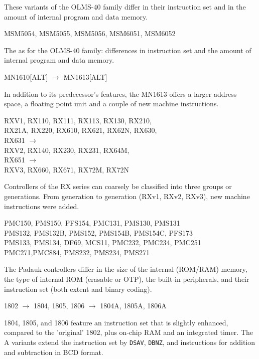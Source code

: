 \documentclass[12pt,twoside]{report}
\newcommand{\tty}[1]{{\tt #1}}
\begin{document}
These variants of the OLMS-40 family differ in their instruction
set and in the amount of internal program and data memory.
\begin{cpulist}
   MSM5054, MSM5055, MSM5056, MSM6051, MSM6052
\end{cpulist}
The as for the OLMS-40 family: differences in instruction
set and the amount of internal program and data memory.
\begin{cpulist}
   MN1610[ALT] $\rightarrow$ MN1613[ALT]
\end{cpulist}
In addition to its predecessor's features, the MN1613 offers a larger
address space, a floating point unit and a couple of new machine
instructions.
\begin{cpulist}
   RXV1, RX110, RX111, RX113, RX130, RX210,\\
\> RX21A, RX220, RX610, RX621, RX62N, RX630,\\
\> RX631 $\longrightarrow$ \\
\> RXV2, RX140, RX230, RX231, RX64M,\\
\> RX651 $\longrightarrow$ \\
\> RXV3, RX660, RX671, RX72M, RX72N
\end{cpulist}
Controllers of the RX series can coarsely be classified
into three groups or generations.  From generation to 
generation (RXv1, RXv2, RXv3), new machine instructions
were added.
\begin{cpulist}
   PMC150, PMS150, PFS154, PMC131, PMS130, PMS131 \\
\> PMS132, PMS132B, PMS152, PMS154B, PMS154C, PFS173 \\
\> PMS133, PMS134, DF69, MCS11, PMC232, PMC234, PMC251 \\
\> PMC271,PMC884, PMS232, PMS234, PMS271
\end{cpulist}
The Padauk controllers differ in the size of the internal
(ROM/RAM) memory, the type of internal ROM (erasable or OTP),
the built-in peripherals, and their instruction set (both
extent and binary coding).
\begin{cpulist}
   1802 $\rightarrow$ 1804, 1805, 1806 $\rightarrow$ 1804A,
1805A, 1806A
\end{cpulist}
1804, 1805, and 1806 feature an instruction set that is slightly
enhanced, compared to the 'original' 1802, plus on-chip RAM and
an integrated timer.  The A variants extend the instruction set by
\tty{DSAV}, \tty{DBNZ}, and instructions for addition and
subtraction in BCD format.
\end{document}
